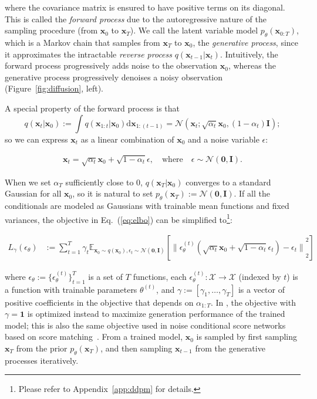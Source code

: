 where the covariance matrix is ensured to have positive terms on its diagonal. This is called the \textit{forward process} due to the autoregressive nature of the sampling procedure (from ${\bm{x}}_0$ to ${\bm{x}}_T$). We call the latent variable model $p_\theta({\bm{x}}_{0:T})$, which is a Markov chain that samples from ${\bm{x}}_T$ to ${\bm{x}}_0$, the \textit{generative process}, since it approximates the intractable \textit{reverse process} $q({\bm{x}}_{t-1} | {\bm{x}}_t)$. Intuitively, the forward process progressively adds noise to the observation ${\bm{x}}_0$, whereas the generative process progressively denoises a noisy observation (Figure~\ref{fig:diffusion}, left).

A special property of the forward process is that $$
q({\bm{x}}_t | {\bm{x}}_0) := \int q({\bm{x}}_{1:t} | {\bm{x}}_0) \mathrm{d} {\bm{x}}_{1:(t-1)}= {\mathcal{N}}({\bm{x}}_t; \sqrt{\alpha_t} {\bm{x}}_0, (1 - \alpha_t) {\bm{I}});
$$ 
so we can express ${\bm{x}}_t$ as a linear combination of ${\bm{x}}_0$ and a noise variable $\epsilon$:

\begin{align}
    {\bm{x}}_t = \sqrt{\alpha_t} {\bm{x}}_0 + \sqrt{1 - \alpha_t} \epsilon, \quad \text{where} \quad \epsilon \sim {\mathcal{N}}({\bm{0}}, {\bm{I}}). \label{eq:reparam_xt}
\end{align}

When we set $\alpha_{T}$ sufficiently close to $0$, $q({\bm{x}}_T | {\bm{x}}_0)$ converges to a standard Gaussian for all ${\bm{x}}_0$, so it is natural to set $p_\theta({\bm{x}}_T) := {\mathcal{N}}({\bm{0}}, {\bm{I}})$.
If all the conditionals are modeled as Gaussians with trainable mean functions and fixed variances, the objective in Eq.~(\ref{eq:elbo}) can be simplified to\footnote{Please refer to Appendix~\ref{app:ddpm} for details.}:

\begin{align}
    L_\gamma(\epsilon_\theta) & := \sum_{t=1}^{T}\gamma_t{\mathbb{E}}_{{\bm{x}}_0 \sim q({\bm{x}}_0), \epsilon_t \sim {\mathcal{N}}({\bm{0}}, {\bm{I}})}\left[  {\lVert {\epsilon_{\theta}^{(t)}(\sqrt{\alpha_t} {\bm{x}}_0 + \sqrt{1 - \alpha_t} \epsilon_t) - \epsilon_t} \rVert}_2^2 \right] \label{eq:l-gamma}
\end{align}

where $\epsilon_\theta := \{\epsilon_\theta^{(t)}\}_{t=1}^{T}$ is a set of $T$ functions, each $\epsilon_{\theta}^{(t)}: {\mathcal{X}} \to {\mathcal{X}}$ (indexed by $t$) is a function with trainable parameters $\theta^{(t)}$, and $\gamma := [\gamma_1, \ldots, \gamma_T]$ is a vector of positive coefficients in the objective that depends on $\alpha_{1:T}$. 
In \citet{ho2020denoising}, the objective with $\gamma = {\bm{1}}$ is optimized instead to maximize generation performance of the trained model; this is also the same objective used in noise conditional score networks~\citep{song2019generative} based on score matching~\citep{h2005estimation,vincent2011connection}. From a trained model, ${\bm{x}}_0$ is sampled by first sampling ${\bm{x}}_T$ from the prior $p_\theta({\bm{x}}_T)$, and then sampling ${\bm{x}}_{t-1}$ from the generative processes iteratively. 

